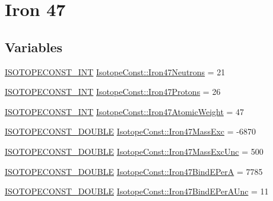 \hypertarget{group___isotope_const-_iron-_fe47}{}\section{Iron 47}
\label{group___isotope_const-_iron-_fe47}
\subsection*{Variables}
\begin{DoxyCompactItemize}
\item 
\mbox{\hyperlink{group___isotope_const-_macros_ga5f18360b3e99483a35c32d789e62621c}{I\+S\+O\+T\+O\+P\+E\+C\+O\+N\+S\+T\+\_\+\+I\+NT}} \mbox{\hyperlink{group___isotope_const-_iron-_fe47_gae88b618d53af27ac5a09c01fb023316a}{Isotope\+Const\+::\+Iron47\+Neutrons}} = 21
\item 
\mbox{\hyperlink{group___isotope_const-_macros_ga5f18360b3e99483a35c32d789e62621c}{I\+S\+O\+T\+O\+P\+E\+C\+O\+N\+S\+T\+\_\+\+I\+NT}} \mbox{\hyperlink{group___isotope_const-_iron-_fe47_ga759c28ddcb963e059b69cd380509de33}{Isotope\+Const\+::\+Iron47\+Protons}} = 26
\item 
\mbox{\hyperlink{group___isotope_const-_macros_ga5f18360b3e99483a35c32d789e62621c}{I\+S\+O\+T\+O\+P\+E\+C\+O\+N\+S\+T\+\_\+\+I\+NT}} \mbox{\hyperlink{group___isotope_const-_iron-_fe47_ga13e1277325b21bea37e22dc698f5a088}{Isotope\+Const\+::\+Iron47\+Atomic\+Weight}} = 47
\item 
\mbox{\hyperlink{group___isotope_const-_macros_ga8f45a7272ce02c0b4c65c44636ed719a}{I\+S\+O\+T\+O\+P\+E\+C\+O\+N\+S\+T\+\_\+\+D\+O\+U\+B\+LE}} \mbox{\hyperlink{group___isotope_const-_iron-_fe47_ga61f7b1991c84e6e6e0c71a7c2dbf0fb8}{Isotope\+Const\+::\+Iron47\+Mass\+Exc}} = -\/6870
\item 
\mbox{\hyperlink{group___isotope_const-_macros_ga8f45a7272ce02c0b4c65c44636ed719a}{I\+S\+O\+T\+O\+P\+E\+C\+O\+N\+S\+T\+\_\+\+D\+O\+U\+B\+LE}} \mbox{\hyperlink{group___isotope_const-_iron-_fe47_ga58def914d8eb2df4ae0f8ea6ca01ecc6}{Isotope\+Const\+::\+Iron47\+Mass\+Exc\+Unc}} = 500
\item 
\mbox{\hyperlink{group___isotope_const-_macros_ga8f45a7272ce02c0b4c65c44636ed719a}{I\+S\+O\+T\+O\+P\+E\+C\+O\+N\+S\+T\+\_\+\+D\+O\+U\+B\+LE}} \mbox{\hyperlink{group___isotope_const-_iron-_fe47_ga462c389be62c1c767e8dab90226348c2}{Isotope\+Const\+::\+Iron47\+Bind\+E\+PerA}} = 7785
\item 
\mbox{\hyperlink{group___isotope_const-_macros_ga8f45a7272ce02c0b4c65c44636ed719a}{I\+S\+O\+T\+O\+P\+E\+C\+O\+N\+S\+T\+\_\+\+D\+O\+U\+B\+LE}} \mbox{\hyperlink{group___isotope_const-_iron-_fe47_ga87aa4e92d1f6f8f9718868539d9758d0}{Isotope\+Const\+::\+Iron47\+Bind\+E\+Per\+A\+Unc}} = 11

\end{DoxyCompactItemize}
